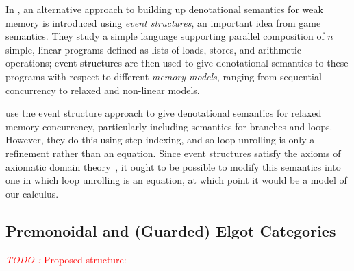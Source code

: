 \documentclass[acmsmall,screen,review]{acmart}
\newcounter{todos}
\newcommand{\TODO}[1]{{
  \stepcounter{todos}
  \begin{center}\large{\textcolor{red}{\emph{TODO \arabic{todos}:} #1}}\end{center}
}}
\begin{document}
\begin{itemize}
  In \cite{castellan-16}, an alternative approach to building up denotational semantics for weak
  memory is introduced using \emph{event structures}, an important idea from game semantics. They
  study a simple language supporting parallel composition of $n$ simple, linear programs defined as
  lists of loads, stores, and arithmetic operations; event structures are then used to give
  denotational semantics to these programs with respect to different \emph{memory models}, ranging
  from sequential concurrency to relaxed and non-linear models.

  \citet{paviotti-modular-relaxed-dep-20} use the event structure approach to give denotational
  semantics for relaxed memory concurrency, particularly including semantics for branches and loops.
  However, they do this using step indexing, and so loop unrolling is only a refinement rather than
  an equation. Since event structures satisfy the axioms of axiomatic domain
  theory~\citet{fiore-phd-94}, it ought to be possible to modify this semantics into one in which
  loop unrolling is an equation, at which point it would be a model of our calculus. 
\end{itemize}

\subsection{Premonoidal and (Guarded) Elgot Categories}

\TODO{Proposed structure:}
\end{document}
